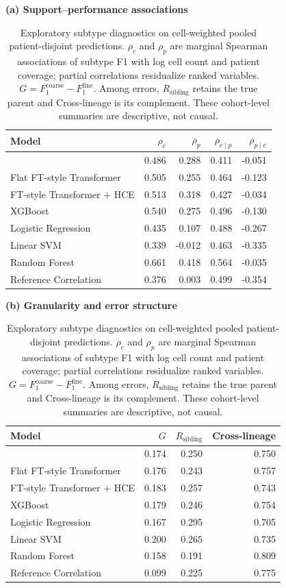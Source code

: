 \begin{table}[H]
\centering
\small
\setlength{\tabcolsep}{8pt}
\renewcommand{\arraystretch}{1.08}
\textbf{(a) Support--performance associations}\\[3pt]
\begin{tabular}{lrrrr}
\toprule
\textbf{Model} & $\rho_{c}$ & $\rho_{p}$ & $\rho_{c\mid p}$ & $\rho_{p\mid c}$ \\
\midrule
\ourmethod{} & 0.486 & 0.288 & 0.411 & -0.051 \\
Flat FT-style Transformer & 0.505 & 0.255 & 0.464 & -0.123 \\
FT-style Transformer $+$ HCE & 0.513 & 0.318 & 0.427 & -0.034 \\
XGBoost & 0.540 & 0.275 & 0.496 & -0.130 \\
Logistic Regression & 0.435 & 0.107 & 0.488 & -0.267 \\
Linear SVM & 0.339 & -0.012 & 0.463 & -0.335 \\
Random Forest & 0.661 & 0.418 & 0.564 & -0.035 \\
Reference Correlation & 0.376 & 0.003 & 0.499 & -0.354 \\
\bottomrule
\end{tabular}

\vspace{6pt}
\textbf{(b) Granularity and error structure}\\[3pt]
\begin{tabular}{lrrr}
\toprule
\textbf{Model} & $G$ & $R_{\mathrm{sibling}}$ & \textbf{Cross-lineage} \\
\midrule
\ourmethod{} & 0.174 & 0.250 & 0.750 \\
Flat FT-style Transformer & 0.176 & 0.243 & 0.757 \\
FT-style Transformer $+$ HCE & 0.183 & 0.257 & 0.743 \\
XGBoost & 0.179 & 0.246 & 0.754 \\
Logistic Regression & 0.167 & 0.295 & 0.705 \\
Linear SVM & 0.200 & 0.265 & 0.735 \\
Random Forest & 0.158 & 0.191 & 0.809 \\
Reference Correlation & 0.099 & 0.225 & 0.775 \\
\bottomrule
\end{tabular}
\caption{Exploratory subtype diagnostics on cell-weighted pooled patient-disjoint predictions.
$\rho_c$ and $\rho_p$ are marginal Spearman associations of subtype F1 with log
cell count and patient coverage; partial correlations residualize ranked
variables. $G=F_{1}^{\mathrm{coarse}}-F_{1}^{\mathrm{fine}}$. Among errors,
$R_{\mathrm{sibling}}$ retains the true parent and Cross-lineage is its
complement. These cohort-level summaries are descriptive, not causal.}
\label{tab:subtype_diagnostics}
\end{table}
